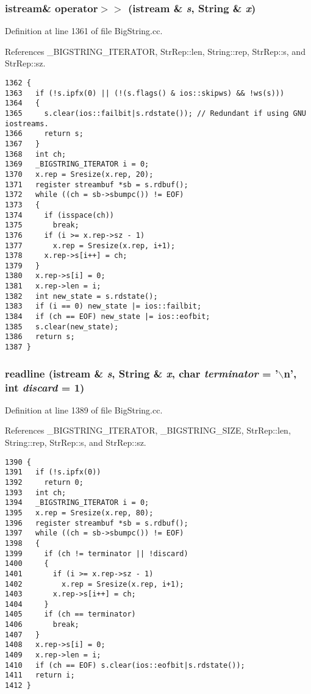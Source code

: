 \subsubsection{\setlength{\rightskip}{0pt plus 5cm}istream\& operator$>$$>$ (istream \& {\em s}, {\bf String} \& {\em x})}\label{BigString_8cc_a42}




Definition at line 1361 of file Big\-String.cc.

References \_\-BIGSTRING\_\-ITERATOR, Str\-Rep::len, String::rep, Str\-Rep::s, and Str\-Rep::sz.



\footnotesize\begin{verbatim}1362 {
1363   if (!s.ipfx(0) || (!(s.flags() & ios::skipws) && !ws(s)))
1364   {
1365     s.clear(ios::failbit|s.rdstate()); // Redundant if using GNU iostreams.
1366     return s;
1367   }
1368   int ch;
1369   _BIGSTRING_ITERATOR i = 0;
1370   x.rep = Sresize(x.rep, 20);
1371   register streambuf *sb = s.rdbuf();
1372   while ((ch = sb->sbumpc()) != EOF)
1373   {
1374     if (isspace(ch))
1375       break;
1376     if (i >= x.rep->sz - 1)
1377       x.rep = Sresize(x.rep, i+1);
1378     x.rep->s[i++] = ch;
1379   }
1380   x.rep->s[i] = 0;
1381   x.rep->len = i;
1382   int new_state = s.rdstate();
1383   if (i == 0) new_state |= ios::failbit;
1384   if (ch == EOF) new_state |= ios::eofbit;
1385   s.clear(new_state);
1386   return s;
1387 }
\end{verbatim}\normalsize 
{}
\subsubsection{ readline (istream \& {\em s}, {\bf String} \& {\em x}, char {\em terminator} = '$\backslash$n', int {\em discard} = 1)}\label{BigString_8cc_a43}




Definition at line 1389 of file Big\-String.cc.

References \_\-BIGSTRING\_\-ITERATOR, \_\-BIGSTRING\_\-SIZE, Str\-Rep::len, String::rep, Str\-Rep::s, and Str\-Rep::sz.



\footnotesize\begin{verbatim}1390 {
1391   if (!s.ipfx(0))
1392     return 0;
1393   int ch;
1394   _BIGSTRING_ITERATOR i = 0;
1395   x.rep = Sresize(x.rep, 80);
1396   register streambuf *sb = s.rdbuf();
1397   while ((ch = sb->sbumpc()) != EOF)
1398   {
1399     if (ch != terminator || !discard)
1400     {
1401       if (i >= x.rep->sz - 1)
1402         x.rep = Sresize(x.rep, i+1);
1403       x.rep->s[i++] = ch;
1404     }
1405     if (ch == terminator)
1406       break;
1407   }
1408   x.rep->s[i] = 0;
1409   x.rep->len = i;
1410   if (ch == EOF) s.clear(ios::eofbit|s.rdstate());
1411   return i;
1412 }
\end{verbatim}\normalsize 
{}
